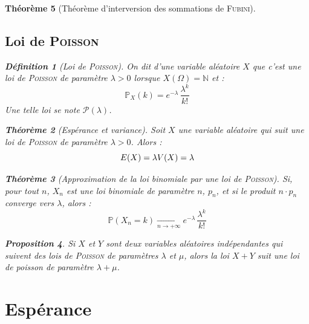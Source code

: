 \documentclass[11pt,a4paper]{report}
\newtheorem{theorem}{Théorème}[chapter]
\newtheorem{prop}[theorem]{Proposition}
\theoremstyle{definition}
\newtheorem{dfn}[theorem]{Définition}
\begin{document}
\begin{theorem}[Théorème d'interversion des sommations de \textsc{Fubini}]
{{\subsection{Loi de \textsc{Poisson}} %
\label{sub:loi_de_poisson}
\begin{dfn}[Loi de \textsc{Poisson}]
     On dit d'une variable aléatoire $X$ que c'est une \emph{loi de \textsc{Poisson}} de paramètre $\lambda >0$ lorsque $X( \Omega ) = \mathbb{N}$ et :
     \begin{equation}
     \mathbb{P}_X (k) = e^{-\lambda}\, \dfrac{\lambda^k}{k !}
     \end{equation}
     Une telle loi se note $\mathscr{P}(\lambda )$.
\end{dfn}
\begin{theorem}[Espérance et variance]
     Soit $X$ une variable aléatoire qui suit une loi de \textsc{Poisson} de paramètre $\lambda > 0$. Alors :
     \begin{equation}
     E(X) = \lambda \\ V(X) = \lambda
     \end{equation}
\end{theorem}
\begin{theorem}[Approximation de la loi binomiale par une loi de \textsc{Poisson}]
     Si, pour tout $n$, $X_n$ est une loi binomiale de paramètre $n$, $p_n$, et si le produit $n\cdot p_n$ converge vers $\lambda$, alors :
     \begin{equation}
     \mathbb{P}(X_n = k) \xrightarrow[n\to+\infty]{} e^{-\lambda}\, \dfrac{\lambda^k}{k!}
     \end{equation}
\end{theorem}
\begin{prop}
     Si $X$ et $Y$ sont deux variables aléatoires indépendantes qui suivent des lois de \textsc{Poisson} de paramètres $\lambda$ et $\mu$, alors la loi $X+Y$ suit une loi de poisson de paramètre $\lambda + \mu$.
\end{prop}


\section{Espérance} %
\label{sec:esperance}
}}
\end{theorem}
\end{document}
